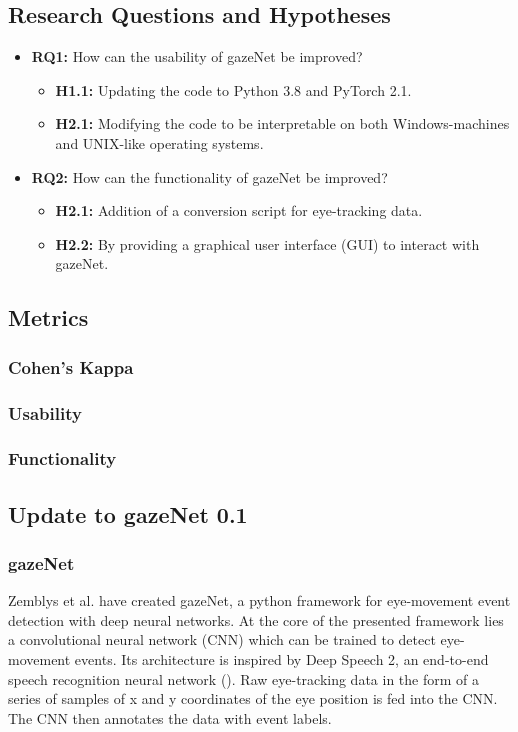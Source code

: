 \documentclass[acmlarge]{acmart}
\begin{document}
\subsection{Research Questions and Hypotheses}
\begin{itemize}
    \item \textbf{RQ1:} How can the usability of gazeNet be improved?
          \begin{itemize}
              \item \textbf{H1.1:} Updating the code to Python 3.8 and PyTorch 2.1.
              \item \textbf{H2.1:} Modifying the code to be interpretable on both Windows-machines and UNIX-like operating systems.
          \end{itemize}
    \item \textbf{RQ2:} How can the functionality of gazeNet be improved?
          \begin{itemize}
              \item \textbf{H2.1:} Addition of a conversion script for eye-tracking data.
              \item \textbf{H2.2:} By providing a graphical user interface (GUI) to interact with gazeNet.
          \end{itemize}
\end{itemize}

\subsection{Metrics}
\subsubsection{Cohen's Kappa}

\subsubsection{Usability}

\subsubsection{Functionality}



\subsection{Update to gazeNet 0.1}
\subsubsection{gazeNet}
Zemblys et al. \cite{zemblys2018gazeNet} have created gazeNet, a python framework for eye-movement event detection with deep neural networks. At the core of the presented framework lies a convolutional neural network (CNN) which can be trained to detect eye-movement events. Its architecture is inspired by Deep Speech 2, an end-to-end speech recognition neural network (\cite{deep_speech_2,zemblys2018gazeNet}). Raw eye-tracking data in the form of a series of samples of x and y coordinates of the eye position is fed into the CNN. The CNN then annotates the data with event labels.
\end{document}
